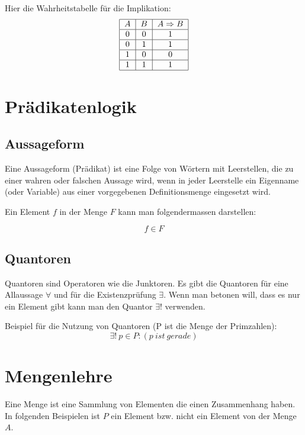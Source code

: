 \documentclass[12pt, a4paper, oneside]{article}
\begin{document}
Hier die Wahrheitstabelle für die Implikation:
\begin{equation}
  \begin{tabular}{|c|c|c|}
    \hline
    $A$ & $B$ & $A \Rightarrow B$ \\ \hline
    0 & 0 & 1 \\ \hline
    0 & 1 & 1 \\ \hline
    1 & 0 & 0 \\ \hline
    1 & 1 & 1 \\ \hline
  \end{tabular}
\end{equation}

\newpage
\section{Prädikatenlogik}
\subsection{Aussageform}
Eine Aussageform (Prädikat) ist eine Folge von Wörtern mit Leerstellen, die zu einer wahren oder falschen Aussage wird, wenn in jeder Leerstelle ein Eigenname (oder Variable) aus einer vorgegebenen Definitionsmenge eingesetzt wird.

Ein Element $f$ in der Menge $F$ kann man folgendermassen darstellen: 

\begin{equation}
  f \in F
\end{equation}

\subsection{Quantoren}
Quantoren sind Operatoren wie die Junktoren. Es gibt die Quantoren für eine Allaussage $\forall$ und für die Existenzprüfung $\exists$. Wenn man betonen will, dass es nur ein Element gibt kann man den Quantor $\exists!$ verwenden.

Beispiel für die Nutzung von Quantoren (P ist die Menge der Primzahlen):
\begin{equation}
  \exists!\ p \in P : (p\ ist\ gerade)
\end{equation}

\newpage
\section{Mengenlehre}
Eine Menge ist eine Sammlung von Elementen die einen Zusammenhang haben. In folgenden Beispielen ist $P$ ein Element bzw. nicht ein Element von der Menge $A$.
 
\end{document}
